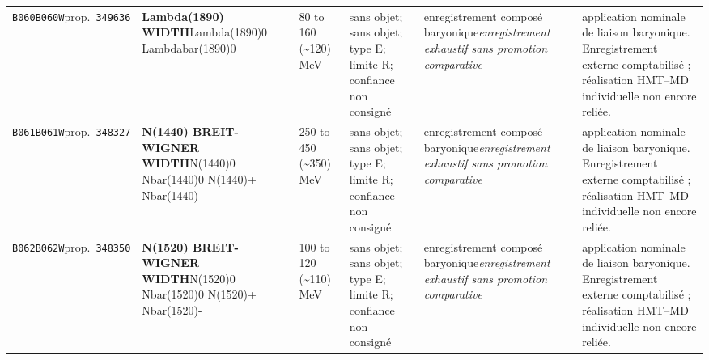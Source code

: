 \begin{landscape}
\begin{longtable}{L{1.85cm}L{4.45cm}L{2.35cm}L{4.05cm}L{3.35cm}L{7.15cm}}
\texttt{B060}\newline \texttt{B060W}\newline prop.\ \texttt{349636} & \textbf{Lambda(1890) WIDTH}\newline Lambda(1890)0 \textbar{}\allowbreak{} Lambdabar(1890)0 & 80 to 160 (\textasciitilde{}120)\,MeV & sans objet; sans objet; type E; limite R; confiance non consigné & enregistrement composé baryonique\newline \emph{enregistrement exhaustif sans promotion comparative} & application nominale de liaison baryonique. Enregistrement externe comptabilisé ; réalisation HMT--MD individuelle non encore reliée. \\
\texttt{B061}\newline \texttt{B061W}\newline prop.\ \texttt{348327} & \textbf{N(1440) BREIT-WIGNER WIDTH}\newline N(1440)0 \textbar{}\allowbreak{} Nbar(1440)0 \textbar{}\allowbreak{} N(1440)+ \textbar{}\allowbreak{} Nbar(1440)- & 250 to 450 (\textasciitilde{}350)\,MeV & sans objet; sans objet; type E; limite R; confiance non consigné & enregistrement composé baryonique\newline \emph{enregistrement exhaustif sans promotion comparative} & application nominale de liaison baryonique. Enregistrement externe comptabilisé ; réalisation HMT--MD individuelle non encore reliée. \\
\texttt{B062}\newline \texttt{B062W}\newline prop.\ \texttt{348350} & \textbf{N(1520) BREIT-WIGNER WIDTH}\newline N(1520)0 \textbar{}\allowbreak{} Nbar(1520)0 \textbar{}\allowbreak{} N(1520)+ \textbar{}\allowbreak{} Nbar(1520)- & 100 to 120 (\textasciitilde{}110)\,MeV & sans objet; sans objet; type E; limite R; confiance non consigné & enregistrement composé baryonique\newline \emph{enregistrement exhaustif sans promotion comparative} & application nominale de liaison baryonique. Enregistrement externe comptabilisé ; réalisation HMT--MD individuelle non encore reliée. \\

\end{longtable}
\end{landscape}
